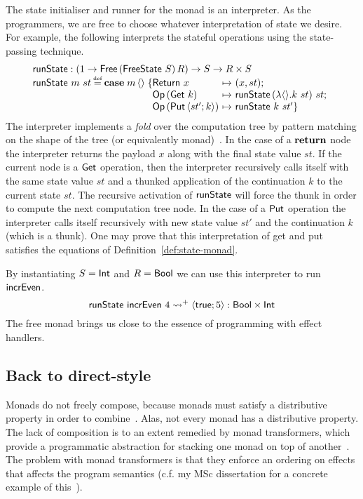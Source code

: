 \documentclass[12pt,phd,lfcs,twoside,openright,logo,leftchapter,normalheadings]{infthesis}
\theoremstyle{plain}
\theoremstyle{definition}
\begin{document}
The state initialiser and runner for the monad is an interpreter. As
the programmers, we are free to choose whatever interpretation of
state we desire. For example, the following interprets the stateful
operations using the state-passing technique.
%
\[
  \bl
    \runState : (\UnitType \to \Free\,(\FreeState~S)\,R) \to S \to R \times S\\
    \runState~m~st \defas
      \Case\;m\,\Unit\;\{
      \ba[t]{@{}l@{~}c@{~}l}
         \return~x      &\mapsto& (x, st);\\
         \OpF\,(\Get~k) &\mapsto& \runState\,(\lambda\Unit.k~st)~st;\\
         \OpF\,(\Put\,\Record{st';k}) &\mapsto& \runState~k~st'
      \}\ea
  \el
\]
%
The interpreter implements a \emph{fold} over the computation tree by
pattern matching on the shape of the tree (or equivalently
monad)~\cite{MeijerFP91}. In the case of a $\mathbf{return}$ node the
interpreter returns the payload $x$ along with the final state value
$st$. If the current node is a $\mathsf{Get}$ operation, then the interpreter
recursively calls itself with the same state value $st$ and a thunked
application of the continuation $k$ to the current state $st$. The
recursive activation of $\mathsf{runState}$ will force the thunk in order to
compute the next computation tree node.  In the case of a $\mathsf{Put}$
operation the interpreter calls itself recursively with new state
value $st'$ and the continuation $k$ (which is a thunk). One may prove
that this interpretation of get and put satisfies the equations of
Definition~\ref{def:state-monad}.
%

By instantiating $S = \mathsf{Int}$ and $R = \mathsf{Bool}$ we can use this
interpreter to run $\mathsf{incrEven}$.
%
\[
  \mathsf{runState}~\mathsf{incrEven}~4 \leadsto^+ \langle \mathsf{true};5 \rangle : \mathsf{Bool} \times \mathsf{Int}
\]
%
The free monad brings us close to the essence of programming with
effect handlers.

\subsection{Back to direct-style}
Monads do not freely compose, because monads must satisfy a
distributive property in order to combine~\cite{KingW92}. Alas, not
every monad has a distributive property.
%
The lack of composition is to an extent remedied by monad
transformers, which provide a programmatic abstraction for stacking
one monad on top of another~\cite{Espinosa95}. The problem with monad
transformers is that they enforce an ordering on effects that affects
the program semantics (c.f. my MSc dissertation for a concrete example
of this~\cite{Hillerstrom15}).
\end{document}
